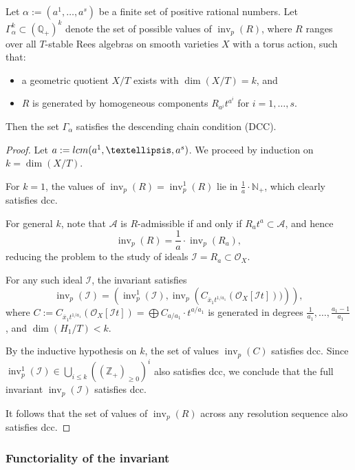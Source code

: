 \documentclass{amsart}
\newcommand{\inv}{{\operatorname{inv}}}
\begin{document}
\begin{lemma}
Let \( \alpha := (a^1, \ldots, a^s) \) be a finite set of positive rational numbers. Let \( \Gamma^k_{\alpha} \subset (\mathbb{Q}_+)^k \) denote the set of possible values of \( \inv_p(R) \), where \( R \) ranges over all \( T \)-stable Rees algebras on smooth varieties \( X \) with a torus action, such that:
\begin{itemize}
    \item a geometric quotient \( X/T \) exists with \( \dim(X/T) = k \), and
    \item \( R \) is generated by homogeneous components \( R_{a^i} t^{a^i} \) for \( i = 1, \ldots, s \).
\end{itemize}
Then the set \( \Gamma_{\alpha} \) satisfies the descending chain condition (DCC).
\end{lemma}

\begin{proof}
Let  \(a := {\rm lcm}(a^1, \ldots, a^s) \). We proceed by induction on \( k = \dim(X/T) \).

For \( k = 1 \), the values of \( \inv_p(R) = \inv^1_p(R) \) lie in \( \frac{1}{a} \cdot \mathbb{N}_+ \), which clearly satisfies dcc.

For general \( k \), note that \( \mathcal{A} \) is \( R \)-admissible if and only if \( R_a t^a \subset \mathcal{A} \), and hence
\[
\inv_p(R) = \frac{1}{a} \cdot \inv_p(R_a),
\]
reducing the problem to the study of ideals \( \mathcal{I} = R_a \subset \mathcal{O}_X \).

For any such ideal \( \mathcal{I} \), the invariant satisfies
\[
\inv_p(\mathcal{I}) = \left( \inv^1_p(\mathcal{I}), \inv_p\left( C_{\overline{x}_1 t^{1/a_1}}(\mathcal{O}_X[\mathcal{I} t])) \right) \right),
\]
where \( C := C_{\overline{x}_1 t^{1/a_1}}(\mathcal{O}_X[\mathcal{I} t])= \bigoplus C_{a/a_1} \cdot t^{a/a_1} \) is generated in degrees \( \frac{1}{a_1}, \ldots, \frac{a_1 - 1}{a_1} \), and \( \dim(H_1/T) < k \).

By the inductive hypothesis on $k$, the set of values \( \inv_p(C) \) satisfies dcc. Since \( \inv^1_p(\mathcal{I}) \in  \bigcup_{i\leq k}(\mathbb{(Z_+)}_{\geq 0})^{ i} \) also satisfies dcc, we conclude that the full invariant \( \inv_p(\mathcal{I}) \) satisfies dcc.

It follows that the set of values of \( \inv_p(R) \) across any resolution sequence also satisfies dcc.
\end{proof}

\subsubsection{Functoriality of the invariant} \cite{ATW-weighted}
\end{document}
